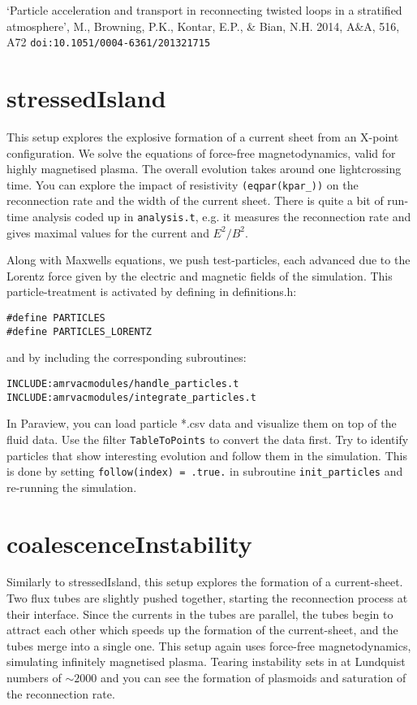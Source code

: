 \documentclass[10pt]{article}
\begin{document}
`Particle acceleration and transport in reconnecting twisted loops in a stratified atmosphere', M., Browning, P.K., Kontar, E.P., \& Bian, N.H. 2014, A\&A, 516, A72 {\tt doi:10.1051/0004-6361/201321715}


\section*{stressedIsland}

This setup explores the explosive formation of a current sheet from an X-point configuration.  We solve the equations of force-free magnetodynamics, valid for highly magnetised plasma.  The overall evolution takes around one lightcrossing time.  
You can explore the impact of resistivity {\tt (eqpar(kpar\_))} on the reconnection rate and the width of the current sheet.  
There is quite a bit of run-time analysis coded up in {\tt analysis.t}, e.g. it measures the reconnection rate and gives maximal values for the current and $E^2/B^2$.  

Along with Maxwells equations, we push test-particles, each advanced due to the Lorentz force given by the electric and magnetic fields of the simulation.  
This particle-treatment is activated by defining in definitions.h:\\
\begin{verbatim}
#define PARTICLES
#define PARTICLES_LORENTZ
\end{verbatim}

and by including the corresponding subroutines:
\begin{verbatim}
INCLUDE:amrvacmodules/handle_particles.t
INCLUDE:amrvacmodules/integrate_particles.t
\end{verbatim}

In Paraview, you can load particle *.csv data and visualize them on top of the fluid data.  Use the filter {\tt TableToPoints} to convert the data first.  
Try to identify particles that show interesting evolution and follow them in the simulation.  This is done by setting {\tt follow(index) = .true.} in subroutine {\tt init\_particles} and re-running the simulation.  

\section*{coalescenceInstability}

Similarly to stressedIsland, this setup explores the formation of a current-sheet.  Two flux tubes are slightly pushed together, starting the reconnection process at their interface.  Since the currents in the tubes are parallel, the tubes begin to attract each other which speeds up the formation of the current-sheet, and the tubes merge into a single one.  This setup again uses force-free magnetodynamics, simulating infinitely magnetised plasma.  Tearing instability sets in at Lundquist numbers of $\sim2000$ and you can see the formation of plasmoids and saturation of the reconnection rate.  
\end{document}
